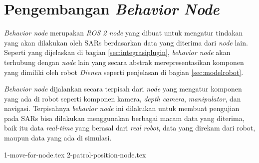\section{Pengembangan \emph{Behavior Node}}
\label{sec:behaviornode}

\emph{Behavior node} merupakan \emph{ROS 2 node} yang dibuat untuk mengatur tindakan yang akan dilakukan oleh SARs berdasarkan data yang diterima dari \emph{node} lain.
Seperti yang dijelaskan di bagian \ref{sec:integrasiplugin},
  \emph{behavior node} akan terhubung dengan \emph{node} lain yang secara abstrak merepresentasikan komponen yang dimiliki oleh robot \emph{Dienen} seperti penjelasan di bagian \ref{sec:modelrobot}.

\emph{Behavior node} dijalankan secara terpisah dari \emph{node} yang mengatur komponen yang ada di robot seperti komponen kamera, \emph{depth camera}, \emph{manipulator}, dan navigasi.
Terpisahnya \emph{behavior node} ini dilakukan untuk membuat pengujian pada SARs bisa dilakukan menggunakan berbagai macam data yang diterima,
  baik itu data \emph{real-time} yang berasal dari \emph{real robot},
  data yang direkam dari robot,
  maupun data yang ada di simulasi.

{1-move-for-node.tex}
{2-patrol-position-node.tex}

